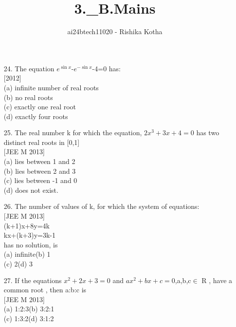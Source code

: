 \documentclass[journal,12pt,twocolumn]{IEEEtran}
\theoremstyle{remark}
\begin{document}

\vspace{3cm}

\title{3.\_B.Mains}
\author{ai24btech11020 - Rishika Kotha}
\begin{enumerate}
\maketitle
\item[24.] The equation $e^{\sin x}$-$e^{-\sin x}$-4=0 has:\\[2pt][2012]\\[6pt]
        (a)   infinite number of real roots\\[2pt]
        (b)   no real roots\\[2pt]
        (c)   exactly one real root\\[2pt]
        (d)   exactly four roots\\[6pt]
\item[25.] The real number k for which the equation, $2x^3+3x+4=0$ has two distinct real roots in [0,1]\\[2pt][JEE M 2013]\\[6pt]
        (a)  lies between 1 and 2\\[2pt]
        (b)  lies between 2 and 3\\[2pt]
        (c)  lies between -1 and 0\\[2pt]
        (d)  does not exist.\\[6pt]
\item[26.] The number of values of k, for which the system of equations:\\[2pt][JEE M 2013]\\[6pt]
     (k+1)x+8y=4k\\[2pt]
     kx+(k+3)y=3k-1\\[2pt]
has no solution, is\\[2pt]
(a)  infinite\hspace{2.4cm}(b)  1\\[2pt]
(c)  2\hspace{3.4cm}(d)  3\\[6pt]
\item[27.] If the equations $x^2+2x+3=0$ and $ax^2+bx+c=0$,a,b,c$\in$ R , have a   common   root , then a:b:c is\\[2pt][JEE M 2013]\\[6pt]
(a)  1:2:3\hspace{2.7cm}(b)  3:2:1\\[2pt]
(c)  1:3:2\hspace{2.7cm}(d)  3:1:2\\[6pt] 

\end{enumerate}
\end{document}
